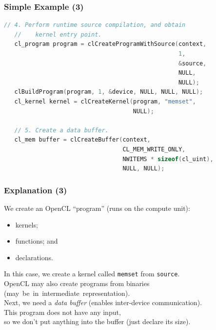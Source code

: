 \begin{frame}[fragile]
  \frametitle{Simple Example (3)}


  \begin{lstlisting}[language=C]
   // 4. Perform runtime source compilation, and obtain
   //    kernel entry point.
   cl_program program = clCreateProgramWithSource(context,
                                                  1,
                                                  &source,
                                                  NULL,
                                                  NULL);
   clBuildProgram(program, 1, &device, NULL, NULL, NULL);
   cl_kernel kernel = clCreateKernel(program, "memset",
                                     NULL);

   // 5. Create a data buffer.
   cl_mem buffer = clCreateBuffer(context,
                                  CL_MEM_WRITE_ONLY,
                                  NWITEMS * sizeof(cl_uint),
                                  NULL, NULL);
  \end{lstlisting}

\end{frame}

\begin{frame}
  \frametitle{Explanation (3)}


    We create an OpenCL ``program'' (runs on the compute unit):
      \begin{itemize}
        \item kernels;
        \item functions; and
        \item declarations.
      \end{itemize}
    In this case, we create a kernel called {\tt memset} from {\tt source}.\\
    OpenCL may also create programs from binaries\\
      (may~be~in~intermediate~representation).\\[1em]

    Next, we need a {\it data buffer} (enables inter-device communication).\\[1em]

    This program does not have any input, \\
      so we don't put anything into
      the buffer (just declare its size).

\end{frame}

